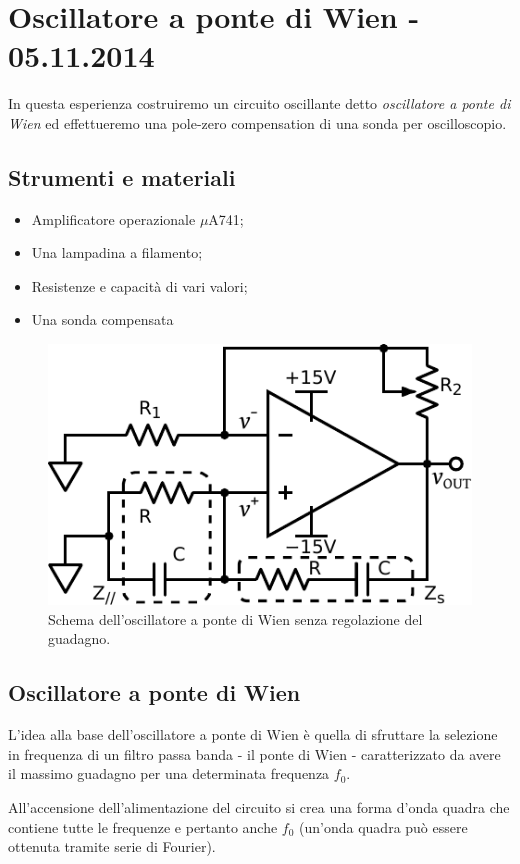 \section{Oscillatore a ponte di Wien - 05.11.2014}

In questa esperienza costruiremo un circuito oscillante detto \textit{oscillatore a ponte di Wien} ed effettueremo una pole-zero compensation di una sonda per oscilloscopio.

\subsection*{Strumenti e materiali}

\begin{itemize} [noitemsep]
		\item Amplificatore operazionale $\mu$A741;
		\item Una lampadina a filamento;
		\item Resistenze e capacità di vari valori;
		\item Una sonda compensata
\end{itemize}

\begin{figure}
\centering
\includegraphics[width=.35\textwidth]{../E08/latex/osc.pdf}
\caption{Schema dell'oscillatore a ponte di Wien senza regolazione del guadagno.}
\label{cir8:without_lamp}
\end{figure}

\subsection{Oscillatore a ponte di Wien}

L'idea alla base dell'oscillatore a ponte di Wien è quella di sfruttare la selezione in frequenza di un filtro passa banda - il ponte di Wien - caratterizzato da avere il massimo guadagno per una determinata frequenza $f_0$.

All'accensione dell'alimentazione del circuito si crea una forma d'onda quadra che contiene tutte le frequenze e pertanto anche $f_0$ (un'onda quadra può essere ottenuta tramite serie di Fourier).

